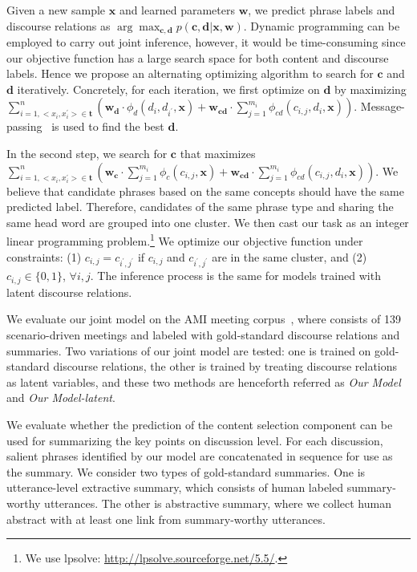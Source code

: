 Given a new sample $\mathbf{x}$ and learned parameters $\mathbf{w}$, we predict phrase labels and discourse relations as $\arg \max_{\mathbf{c}, \mathbf{d}} p(\mathbf{c}, \mathbf{d}|\mathbf{x}, \mathbf{w})$. Dynamic programming can be employed to carry out joint inference, however, it would be time-consuming since our objective function has a large search space for both content and discourse labels. Hence we propose an alternating optimizing algorithm to search for $\mathbf{c}$ and $\mathbf{d}$ iteratively. Concretely, for each iteration, we first optimize on $\mathbf{d}$ by maximizing $\sum_{i=1,<x_i, x_i^\prime>\in \mathbf{t}}^{n} (\mathbf{w_d}\cdot \phi_d (d_{i},d_{i^\prime}, \mathbf{x}) + \mathbf{w_{cd}}\cdot \sum_{j=1}^{m_i} \phi_{cd} (c_{i,j}, d_{i}, \mathbf{x}))$. Message-passing~\cite{smith2008dependency} is used to find the best $\mathbf{d}$.

In the second step, we search for $\mathbf{c}$ that maximizes $\sum_{i=1,<x_i, x_i^\prime>\in \mathbf{t}}^{n} (\mathbf{w_c}\cdot \sum_{j=1}^{m_i} \phi_c (c_{i,j}, \mathbf{x}) + \mathbf{w_{cd}}\cdot \sum_{j=1}^{m_i} \phi_{cd} (c_{i,j}, d_{i}, \mathbf{x}) )$. We believe that candidate phrases based on the same concepts should have the same predicted label. Therefore, candidates of the same phrase type and sharing the same head word are grouped into one cluster. We then cast our task as an integer linear programming problem.\footnote{We use lpsolve: \url{http://lpsolve.sourceforge.net/5.5/}.} We optimize our objective function under constraints: (1) $c_{i,j}=c_{i^\prime, j^\prime}$ if $c_{i,j}$ and $c_{i^\prime, j^\prime}$ are in the same cluster, and (2) $c_{i,j}\in \{0, 1\} $, $\forall i, j$. The inference process is the same for models trained with latent discourse relations.

We evaluate our joint model on the AMI meeting corpus~\cite{ami}, where consists of 139 scenario-driven meetings and labeled with gold-standard discourse relations and summaries. Two variations of our joint model are tested: one is trained on gold-standard discourse relations, the other is trained by treating discourse relations as latent variables, and these two  methods are henceforth referred as \textit{Our Model} and \textit{Our Model-latent}. 

We evaluate whether the prediction of the content selection component can be used for summarizing the key points on discussion level. For each discussion, salient phrases identified by our model are concatenated in sequence for use as the summary. We consider two types of gold-standard summaries. One is utterance-level extractive summary, which consists of human labeled summary-worthy utterances. The other is abstractive summary, where we collect human abstract with at least one link from summary-worthy utterances.

